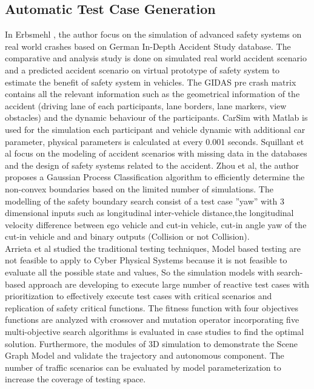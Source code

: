\subsection{Automatic Test Case Generation}

In  Erbsmehl \cite{erbsmehl2009simulation},  the  author  focus  on  the  simulation  of  advanced  safety  systems  on  real  world crashes based on German In-Depth Accident Study database.  The comparative and analysis study is done on simulated real world accident scenario and a predicted accident scenario on virtual prototype of safety system to estimate the benefit of safety system in vehicles. The GIDAS pre crash matrix contains all the relevant information such as the geometrical information of the accident (driving lane of each participants, lane borders, lane markers, view obstacles) and the dynamic behaviour of the participants. CarSim with Matlab is used for the simulation each participant and vehicle dynamic with additional car parameter, physical parameters is calculated at every 0.001 seconds. Squillant et al\cite{squillante2018modeling} focus  on  the  modeling  of  accident  scenarios  with  missing data  in  the databases and the design of safety systems related to the accident. Zhou et al\cite{zhou2018safety},  the author proposes a Gaussian Process Classification algorithm to efficiently determine the non-convex boundaries based on the limited number of simulations. The modelling of the safety boundary search consist of a test case ”yaw” with 3 dimensional inputs such as longitudinal inter-vehicle distance,the longitudinal velocity difference between ego vehicle and cut-in vehicle,  cut-in angle yaw of the cut-in vehicle and and binary outputs (Collision or not Collision). \\

Arrieta et al\cite{arrieta2018employing} studied the traditional testing techniques,
Model based testing are not feasible to apply to Cyber Physical Systems because it is not feasible to evaluate all the possible state and values, So the simulation models with search-based approach are developing to execute large number of reactive test cases with prioritization to effectively execute test cases with critical scenarios and replication of safety critical functions. The fitness function with four objectives functions are  analyzed  with  crossover  and  mutation  operator  incorporating  five  multi-objective
search algorithms is evaluated in case studies to find the optimal solution. Furthermore, the modules of 3D simulation to demonstrate the Scene Graph Model and validate the trajectory and autonomous component. The number of traffic scenarios can be evaluated by model parameterization to increase the coverage of testing space\cite{zofka2016testing}. 

